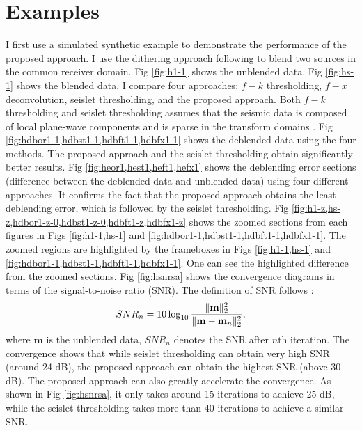 \section{Examples}
I first use a simulated synthetic example to demonstrate the performance of the proposed approach. I use the dithering approach following \cite{yangkang20142} to blend two sources in the common receiver domain. Fig \ref{fig:h1-1} shows the unblended data. Fig \ref{fig:hs-1} shows the blended data. I compare four approaches: $f-k$ thresholding, $f-x$ deconvolution, seislet thresholding, and the proposed approach. Both $f-k$ thresholding and seislet thresholding assumes that the seismic data is composed of local plane-wave components and is sparse in the transform domains \cite{sanyi2015}.  Fig \ref{fig:hdbor1-1,hdbst1-1,hdbft1-1,hdbfx1-1} 
shows the deblended data using the four methods. The proposed approach and the seislet thresholding obtain significantly better results. Fig \ref{fig:heor1,hest1,heft1,hefx1} shows the deblending error sections (difference between the deblended data and unblended data) using four different approaches. It confirms the fact that the proposed approach obtains the least deblending error, which is followed by the seislet thresholding.  Fig \ref{fig:h1-z,hs-z,hdbor1-z-0,hdbst1-z-0,hdbft1-z,hdbfx1-z} shows the zoomed sections from each figures in Figs \ref{fig:h1-1,hs-1} and \ref{fig:hdbor1-1,hdbst1-1,hdbft1-1,hdbfx1-1}.
The zoomed regions are highlighted by the frameboxes in Figs \ref{fig:h1-1,hs-1} and \ref{fig:hdbor1-1,hdbst1-1,hdbft1-1,hdbfx1-1}. One can see the highlighted difference from the zoomed sections. Fig \ref{fig:hsnrsa} shows the convergence diagrams in terms of the signal-to-noise ratio (SNR). The definition of SNR follows \cite{wencheng2015asa}: 
\begin{equation}
\label{eq:diff}
SNR_n=10\log_{10}\frac{\Arrowvert \mathbf{m} \Arrowvert_2^2}{\Arrowvert \mathbf{m}-\mathbf{m}_n\Arrowvert_2^2},
\end{equation}
where $\mathbf{m}$ is the unblended data, $SNR_n$ denotes the SNR after $n$th iteration. 
The convergence shows that while seislet thresholding can obtain very high SNR (around 24 dB), the proposed approach can obtain the highest SNR (above 30 dB). The proposed approach can also greatly accelerate the convergence. As shown in Fig \ref{fig:hsnrsa}, it only takes around 15 iterations to achieve 25 dB, while the seislet thresholding takes more than 40 iterations to achieve a similar SNR.

